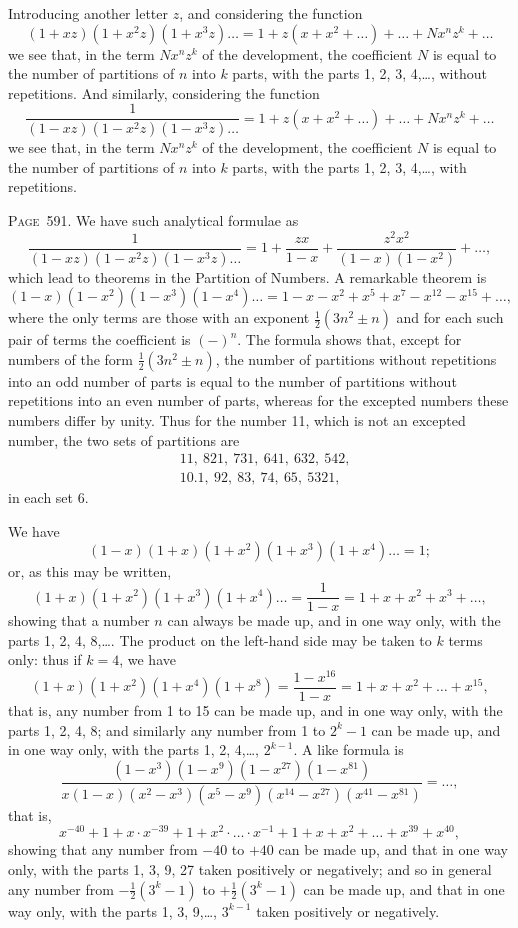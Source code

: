 \documentclass[11pt,a4paper]{article}
\theoremstyle{definition}
\begin{document}
Introducing another letter $z$, and considering the function
\[
(1+xz)(1+x^2z)(1+x^3z)\ldots = 1+z(x+x^2+\ldots)+\ldots+Nx^nz^k+\ldots
\]
we see that, in the term $Nx^nz^k$ of the development, the coefficient $N$ is equal to the number of partitions of $n$ into $k$ parts, with the parts 1, 2, 3, 4,\ldots, without repetitions. And similarly, considering the function
\[
\frac{1}{(1-xz)(1-x^2z)(1-x^3z)\ldots} = 1+z(x+x^2+\ldots)+\ldots+Nx^nz^k+\ldots
\]
we see that, in the term $Nx^nz^k$ of the development, the coefficient $N$ is equal to the number of partitions of $n$ into $k$ parts, with the parts 1, 2, 3, 4,\ldots, with repetitions.

\newpage
\noindent\textsc{Page~591.} We have such analytical formulae as
\[
\frac{1}{(1-xz)(1-x^2z)(1-x^3z)\ldots} = 1+\frac{zx}{1-x}+\frac{z^2x^2}{(1-x)(1-x^2)}+\ldots,
\]
which lead to theorems in the Partition of Numbers. A remarkable theorem is
\[
(1-x)(1-x^2)(1-x^3)(1-x^4)\ldots = 1-x-x^2+x^5+x^7-x^{12}-x^{15}+\ldots,
\]
where the only terms are those with an exponent $\tfrac12(3n^2\pm n)$ and for each such pair of terms the coefficient is $(-)^n$. The formula shows that, except for numbers of the form $\tfrac12(3n^2\pm n)$, the number of partitions without repetitions into an odd number of parts is equal to the number of partitions without repetitions into an even number of parts, whereas for the excepted numbers these numbers differ by unity. Thus for the number 11, which is not an excepted number, the two sets of partitions are
\begin{align*}
&11,\ 821,\ 731,\ 641,\ 632,\ 542,\\
&10.1,\ 92,\ 83,\ 74,\ 65,\ 5321,
\end{align*}
in each set 6.

We have
\[
(1-x)(1+x)(1+x^2)(1+x^3)(1+x^4)\ldots = 1;
\]
or, as this may be written,
\[
(1+x)(1+x^2)(1+x^3)(1+x^4)\ldots = \frac{1}{1-x} = 1+x+x^2+x^3+\ldots,
\]
showing that a number $n$ can always be made up, and in one way only, with the parts 1, 2, 4, 8,\ldots. The product on the left-hand side may be taken to $k$ terms only: thus if $k=4$, we have
\[
(1+x)(1+x^2)(1+x^4)(1+x^8) = \frac{1-x^{16}}{1-x} = 1+x+x^2+\ldots+x^{15},
\]
that is, any number from 1 to 15 can be made up, and in one way only, with the parts 1, 2, 4, 8; and similarly any number from 1 to $2^k-1$ can be made up, and in one way only, with the parts 1, 2, 4,\ldots, $2^{k-1}$. A like formula is
\[
\frac{(1-x^3)(1-x^9)(1-x^{27})(1-x^{81})}{x(1-x)(x^2-x^3)(x^5-x^9)(x^{14}-x^{27})(x^{41}-x^{81})} = \ldots,
\]
that is,
\[
x^{-40}+1+x\cdot x^{-39}+1+x^2\cdot\ldots\cdot x^{-1}+1+x+x^2+\ldots+x^{39}+x^{40},
\]
showing that any number from $-40$ to $+40$ can be made up, and that in one way only, with the parts 1, 3, 9, 27 taken positively or negatively; and so in general any number from $-\tfrac12(3^k-1)$ to $+\tfrac12(3^k-1)$ can be made up, and that in one way only, with the parts 1, 3, 9,\ldots, $3^{k-1}$ taken positively or negatively.
\end{document}
